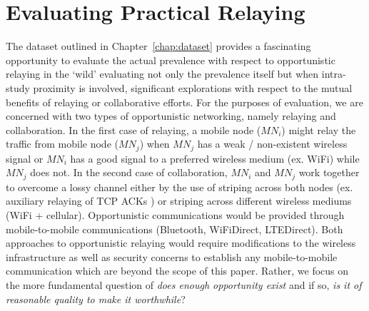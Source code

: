 \section{Evaluating Practical Relaying}\label{sec:potential}

The dataset outlined in Chapter~\ref{chap:dataset} provides a fascinating opportunity to evaluate the actual prevalence with respect to opportunistic relaying in the `wild' evaluating not only the prevalence itself but when intra-study proximity is involved, significant explorations with respect to the mutual benefits of relaying or collaborative efforts.  For the purposes of evaluation, we are concerned with two types of opportunistic networking, namely relaying and collaboration.  In the first case of relaying, a mobile node ($MN_i$) might relay the traffic from mobile node ($MN_j$) when $MN_j$ has a weak / non-existent wireless signal or $MN_i$ has a good signal to a preferred wireless medium (ex. WiFi) while $MN_j$ does not.  In the second case of collaboration, $MN_i$ and $MN_j$ work together to overcome a lossy channel either by the use of striping across both nodes (ex. auxiliary relaying of TCP ACKs \cite{SteenkisteRelayACK}) or striping across different wireless mediums (WiFi + cellular).  Opportunistic communications would be provided through mobile-to-mobile communications (Bluetooth, WiFiDirect, LTEDirect). Both approaches to opportunistic relaying would require modifications to the wireless infrastructure as well as security concerns to establish any mobile-to-mobile communication which are beyond the scope of this paper.  Rather, we focus on the more fundamental question of \emph{does enough opportunity exist} and if so, \emph{is it of reasonable quality to make it worthwhile}?  

